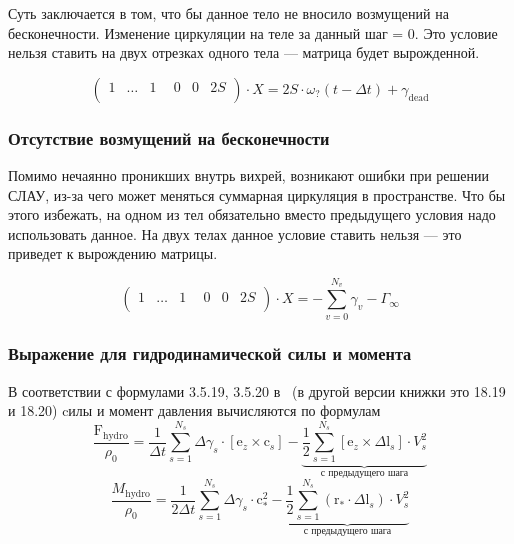 \documentclass[14pt]{extreport}
\newcommand{\br}[1]{\boldsymbol{\mathrm{#1}}}
\renewcommand{\vec}[1]{\br{#1}}
\begin{document}
Суть заключается в том, что бы данное тело не вносило возмущений на бесконечности.
Изменение циркуляции на теле за данный шаг = 0. Это условие нельзя ставить на двух отрезках одного тела --- матрица будет вырожденной.

\begin{equation*}
\left(\begin{matrix}
1& \dotsc& 1& ~~0& 0& 2S\\
\end{matrix}\right)
\cdot X = 2S \cdot \omega_?(t-\Delta t) + \gamma_\text{dead}
\end{equation*}

\subsubsection{Отсутствие возмущений на бесконечности}
\label{slau_infsteday}

Помимо нечаянно проникших внутрь вихрей, возникают ошибки при решении СЛАУ, из-за чего может меняться суммарная циркуляция в пространстве.
Что бы этого избежать, на одном из тел обязательно вместо предыдущего условия надо использовать данное. На двух телах данное условие ставить нельзя --- это приведет к вырождению матрицы.

\begin{equation*}
\left(\begin{matrix}
1& \dotsc& 1& ~~0& 0& 2S\\
\end{matrix}\right)
\cdot X = -\sum\limits_{v=0}^{N_v} \gamma_v - \Gamma_\infty
\end{equation*}

\subsubsection{Выражение для гидродинамической силы и момента}
\label{slau_hydroforce}

В соответствии с формулами 3.5.19, 3.5.20 в~\cite{vvd_book} (в другой версии книжки это 18.19 и 18.20) cилы и момент давления вычисляются по формулам
\begin{equation}
\label{eq_force}
\dfrac{\vec F_\text{hydro}}{\rho_0} = 
\frac{1}{\Delta t} \sum\limits_{s=1}^{N_s} {\Delta \gamma_s \cdot [\vec e_z \times \vec c_s]} -
\underbrace {
	\frac{1}{2} \sum\limits_{s=1}^{N_s}
		[\vec e_z \times \Delta \vec l_s] \cdot V_s^2
}_{\text{с предыдущего шага}}
\end{equation}
%
\begin{equation}
\label{eq_moment}
\dfrac{M_\text{hydro}}{\rho_0} =
\frac{1}{2\Delta t}\sum\limits_{s=1}^{N_s} { \Delta \gamma_s \cdot \vec c_*^2 }
-
\underbrace {
	\frac{1}{2} \sum\limits_{s=1}^{N_s}
		(\vec r_* \cdot \Delta \vec l_s) \cdot V_s^2
}_{\text{с предыдущего шага}}
\end{equation}
%
\end{document}
